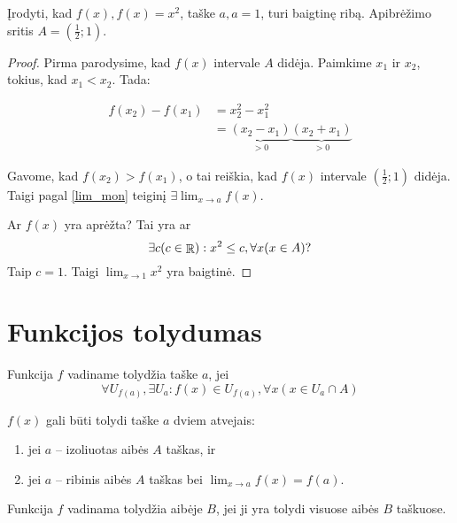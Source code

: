 \begin{exmp}
  Įrodyti, kad $f(x), f(x) = x^2$, taške $a, a = 1$, turi baigtinę ribą.
  Apibrėžimo sritis $A = \left( \frac{1}{2}; 1 \right)$.

  \begin{proof}
    Pirma parodysime, kad $f(x)$ intervale $A$ didėja. Paimkime 
    $x_{1}$ ir $x_{2}$, tokius, kad $x_{1} < x_{2}$. Tada:

    \begin{align*}
      f(x_{2}) - f(x_{1}) 
      &= x _{2} ^{2} - x _{1} ^{2} \\
      &= \underbrace{(x_{2} - x_{1})}_{> 0}
        \underbrace{(x_{2} + x_{1})}_{> 0}
    \end{align*}

    Gavome, kad $f(x_{2}) > f(x_{1})$, o tai reiškia, kad $f(x)$ intervale
    $\left( \frac{1}{2} ; 1 \right)$ didėja. Taigi pagal \ref{lim_mon}
    teiginį $\exists \lim_{x \to a} f(x)$.

    Ar $f(x)$ yra aprėžta? Tai yra ar
    \begin{equation*}
      \exists c (c \in \mathop{\mathbb{R}}) : x^{2} \leq c, \forall x (x \in A)?
    \end{equation*}
    Taip $c = 1$. Taigi $\lim_{x \to 1} x^{2}$ yra baigtinė.
  \end{proof}
\end{exmp}

\section{Funkcijos tolydumas}

\begin{defn}
  Funkcija $f$ vadiname tolydžia taške $a$, jei 
  \begin{equation*}
    \forall U_{f(a)}, \exists U_{a} : 
      f(x) \in U_{f(a)}, \forall x (x \in U_{a} \cap A)
  \end{equation*}
\end{defn}

$f(x)$ gali būti tolydi taške $a$ dviem atvejais:
\begin{enumerate}
  \item jei $a$ – izoliuotas aibės $A$ taškas, ir 
  \item jei $a$ – ribinis aibės $A$ taškas bei 
    $\lim_{x \to a} f(x) = f(a)$.
\end{enumerate}

\begin{defn}
  Funkcija $f$ vadinama tolydžia aibėje $B$, jei ji yra tolydi visuose
  aibės $B$ taškuose.
\end{defn}

